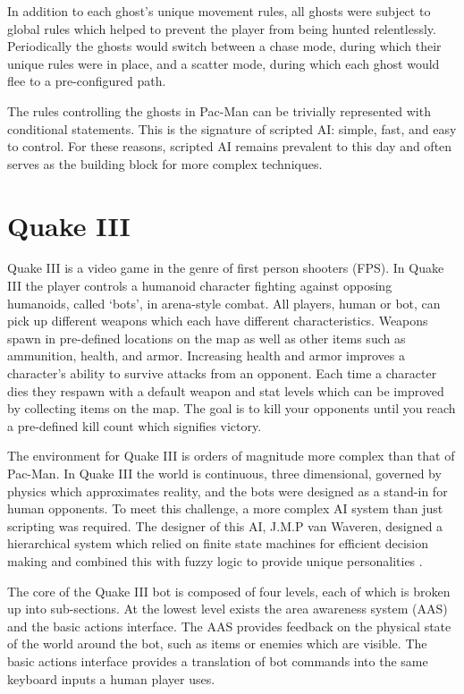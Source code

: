 In addition to each ghost's unique movement rules, all ghosts were subject to global rules which helped to prevent the player from being hunted relentlessly. Periodically the ghosts would switch between a chase mode, during which their unique rules were in place, and a scatter mode, during which each ghost would flee to a pre-configured path.

The rules controlling the ghosts in Pac-Man can be trivially represented with conditional statements. This is the signature of scripted AI: simple, fast, and easy to control. For these reasons, scripted AI remains prevalent to this day and often serves as the building block for more complex techniques.

\section{Quake III}

Quake III is a video game in the genre of first person shooters (FPS). In Quake III the player controls a humanoid character fighting against opposing humanoids, called `bots', in arena-style combat. All players, human or bot, can pick up different weapons which each have different characteristics. Weapons spawn in pre-defined locations on the map as well as other items such as ammunition, health, and armor. Increasing health and armor improves a character's ability to survive attacks from an opponent. Each time a character dies they respawn with a default weapon and stat levels which can be improved by collecting items on the map. The goal is to kill your opponents until you reach a pre-defined kill count which signifies victory. 

The environment for Quake III is orders of magnitude more complex than that of Pac-Man. In Quake III the world is continuous, three dimensional, governed by physics which approximates reality, and the bots were designed as a stand-in for human opponents. To meet this challenge, a more complex AI system than just scripting was required. The designer of this AI, J.M.P van Waveren, designed a hierarchical system which relied on finite state machines for efficient decision making and combined this with fuzzy logic to provide unique personalities \cite{q3bot}.

The core of the Quake III bot is composed of four levels, each of which is broken up into sub-sections. At the lowest level exists the area awareness system (AAS) and the basic actions interface. The AAS provides feedback on the physical state of the world around the bot, such as items or enemies which are visible. The basic actions interface provides a translation of bot commands into the same keyboard inputs a human player uses.

